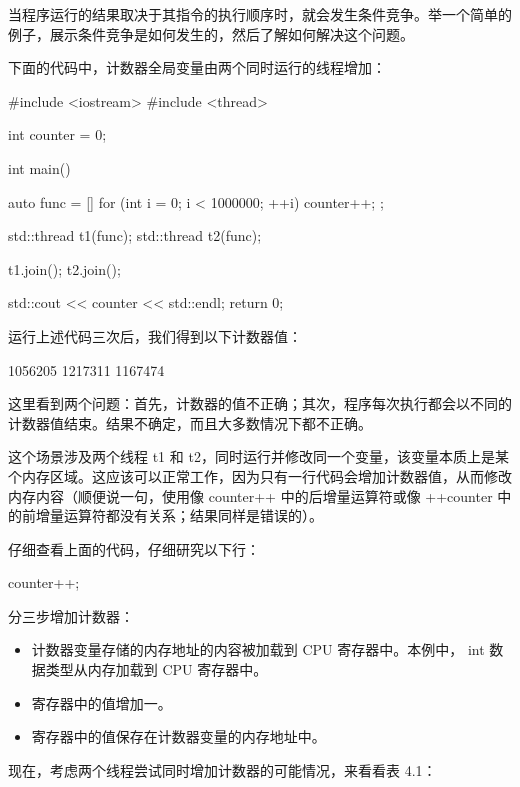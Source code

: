 当程序运行的结果取决于其指令的执行顺序时，就会发生条件竞争。举一个简单的例子，展示条件竞争是如何发生的，然后了解如何解决这个问题。

下面的代码中，计数器全局变量由两个同时运行的线程增加：

\begin{cpp}
#include <iostream>
#include <thread>

int counter = 0;

int main() {
    auto func = [] {
        for (int i = 0; i < 1000000; ++i) {
            counter++;
        }
    };

    std::thread t1(func);
    std::thread t2(func);

    t1.join();
    t2.join();

    std::cout << counter << std::endl;
    return 0;
}
\end{cpp}

运行上述代码三次后，我们得到以下计数器值：

\begin{shell}
1056205
1217311
1167474
\end{shell}

这里看到两个问题：首先，计数器的值不正确；其次，程序每次执行都会以不同的计数器值结束。结果不确定，而且大多数情况下都不正确。

这个场景涉及两个线程 t1 和 t2，同时运行并修改同一个变量，该变量本质上是某个内存区域。这应该可以正常工作，因为只有一行代码会增加计数器值，从而修改内存内容（顺便说一句，使用像 counter++ 中的后增量运算符或像 ++counter 中的前增量运算符都没有关系；结果同样是错误的）。

仔细查看上面的代码，仔细研究以下行：

\begin{cpp}
counter++;
\end{cpp}

分三步增加计数器：

\begin{itemize}
\item
计数器变量存储的内存地址的内容被加载到 CPU 寄存器中。本例中， int 数据类型从内存加载到 CPU 寄存器中。

\item
寄存器中的值增加一。

\item
寄存器中的值保存在计数器变量的内存地址中。
\end{itemize}

现在，考虑两个线程尝试同时增加计数器的可能情况，来看看表 4.1：

